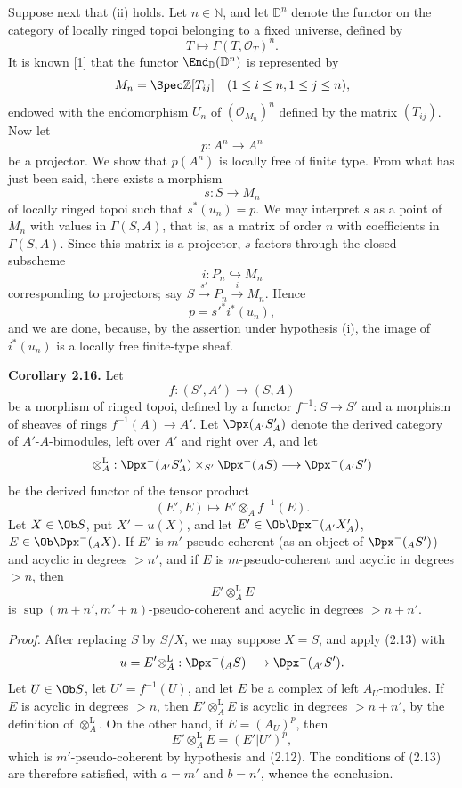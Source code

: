 Suppose next that (ii) holds. Let \(n\in\mathbb N\), and let \(\mathbb D^n\) denote the functor on the category of locally ringed topoi belonging to a fixed universe, defined by
\[
  T\longmapsto \Gamma(T,\mathcal O_T)^n.
\]
It is known [1] that the functor \(\End_{\mathbb D}(\mathbb D^n)\) is represented by
\[
  M_n=\Spec\mathbb Z[T_{ij}]\quad(1\leq i\leq n,
  1\leq j\leq n),
\]
endowed with the endomorphism \(U_n\) of \((\mathcal O_{M_n})^n\) defined by the matrix \((T_{ij})\). Now let
\[
  p:A^n\longrightarrow A^n
\]
be a projector. We show that \(p(A^n)\) is locally free of finite type. From what has just been said, there exists a morphism
\[
  s:S\longrightarrow M_n
\]
of locally ringed topoi such that \(s^*(u_n)=p\). We may interpret \(s\) as a point of \(M_n\) with values in \(\Gamma(S,A)\), that is, as a matrix of order \(n\) with coefficients in \(\Gamma(S,A)\). Since this matrix is a projector, \(s\) factors through the closed subscheme
\[
  i:P_n\hookrightarrow M_n
\]
corresponding to projectors; say \(S\xrightarrow{s'}P_n\xrightarrow{i}M_n\). Hence
\[
  p=s'^* i^*(u_n),
\]
and we are done, because, by the assertion under hypothesis (i), the image of \(i^*(u_n)\) is a locally free finite-type sheaf.

\textbf{Corollary 2.16.} Let
\[
  f:(S',A')\longrightarrow (S,A)
\]
be a morphism of ringed topoi, defined by a functor \(f^{-1}:S\to S'\) and a morphism of sheaves of rings \(f^{-1}(A)\to A'\). Let \(\Dpx(_{A'}S'_A)\) denote the derived category of \(A'\)-\(A\)-bimodules, left over \(A'\) and right over \(A\), and let
\[
  \otimes_A^{\mathrm L}:\Dpx^-(_{A'}S'_A)\times_{S'}\Dpx^-(_A S)
  \longrightarrow \Dpx^-(_{A'}S')
\]
be the derived functor of the tensor product
\[
  (E',E)\longmapsto E'\otimes_A f^{-1}(E).
\]
Let \(X\in\Ob S\), put \(X'=u(X)\), and let \(E'\in\Ob\Dpx^-(_{A'}X'_A)\), \(E\in\Ob\Dpx^-(_A X)\). If \(E'\) is \(m'\)-pseudo-coherent (as an object of \(\Dpx^-(_A S')\)) and acyclic in degrees \(>n'\), and if \(E\) is \(m\)-pseudo-coherent and acyclic in degrees \(>n\), then
\[
  E'\otimes_A^{\mathrm L}E
\]
is \(\sup(m+n',m'+n)\)-pseudo-coherent and acyclic in degrees \(>n+n'\).

\emph{Proof.} After replacing \(S\) by \(S/X\), we may suppose \(X=S\), and apply (2.13) with
\[
  u=E'\otimes_A^{\mathrm L}:\Dpx^-(_A S)\longrightarrow \Dpx^-(_{A'}S').
\]
Let \(U\in\Ob S\), let \(U'=f^{-1}(U)\), and let \(E\) be a complex of left \(A_U\)-modules. If \(E\) is acyclic in degrees \(>n\), then \(E'\otimes_A^{\mathrm L}E\) is acyclic in degrees \(>n+n'\), by the definition of \(\otimes_A^{\mathrm L}\). On the other hand, if \(E=(A_U)^p\), then
\[
  E'\otimes_A^{\mathrm L}E=(E'|U')^p,
\]
which is \(m'\)-pseudo-coherent by hypothesis and (2.12). The conditions of (2.13) are therefore satisfied, with \(a=m'\) and \(b=n'\), whence the conclusion.

